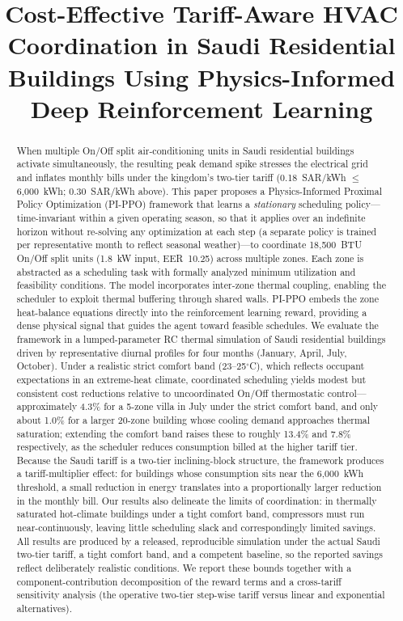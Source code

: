 \documentclass[12pt,a4paper]{article}
\title{Cost-Effective Tariff-Aware HVAC Coordination in Saudi Residential Buildings Using Physics-Informed Deep Reinforcement Learning}
\author{}
\date{}
\begin{document}
\maketitle

\begin{center}
\end{center}


\begin{abstract}
\noindent When multiple On/Off split air-conditioning units in Saudi residential buildings activate simultaneously, the resulting peak demand spike stresses the electrical grid and inflates monthly bills under the kingdom's two-tier tariff (0.18~SAR/kWh $\leq$ 6{,}000~kWh; 0.30~SAR/kWh above). This paper proposes a Physics-Informed Proximal Policy Optimization (PI-PPO) framework that learns a \textit{stationary} scheduling policy---time-invariant within a given operating season, so that it applies over an indefinite horizon without re-solving any optimization at each step (a separate policy is trained per representative month to reflect seasonal weather)---to coordinate 18{,}500~BTU On/Off split units (1.8~kW input, EER~10.25) across multiple zones. Each zone is abstracted as a scheduling task with formally analyzed minimum utilization and feasibility conditions. The model incorporates inter-zone thermal coupling, enabling the scheduler to exploit thermal buffering through shared walls. PI-PPO embeds the zone heat-balance equations directly into the reinforcement learning reward, providing a dense physical signal that guides the agent toward feasible schedules. We evaluate the framework in a lumped-parameter RC thermal simulation of Saudi residential buildings driven by representative diurnal profiles for four months (January, April, July, October). Under a realistic strict comfort band (23--25$^\circ$C), which reflects occupant expectations in an extreme-heat climate, coordinated scheduling yields modest but consistent cost reductions relative to uncoordinated On/Off thermostatic control---approximately 4.3\% for a 5-zone villa in July under the strict comfort band, and only about 1.0\% for a larger 20-zone building whose cooling demand approaches thermal saturation; extending the comfort band raises these to roughly 13.4\% and 7.8\% respectively, as the scheduler reduces consumption billed at the higher tariff tier. Because the Saudi tariff is a two-tier inclining-block structure, the framework produces a tariff-multiplier effect: for buildings whose consumption sits near the 6{,}000~kWh threshold, a small reduction in energy translates into a proportionally larger reduction in the monthly bill. Our results also delineate the limits of coordination: in thermally saturated hot-climate buildings under a tight comfort band, compressors must run near-continuously, leaving little scheduling slack and correspondingly limited savings. All results are produced by a released, reproducible simulation under the actual Saudi two-tier tariff, a tight comfort band, and a competent baseline, so the reported savings reflect deliberately realistic conditions. We report these bounds together with a component-contribution decomposition of the reward terms and a cross-tariff sensitivity analysis (the operative two-tier step-wise tariff versus linear and exponential alternatives).

\end{abstract}
\end{document}
